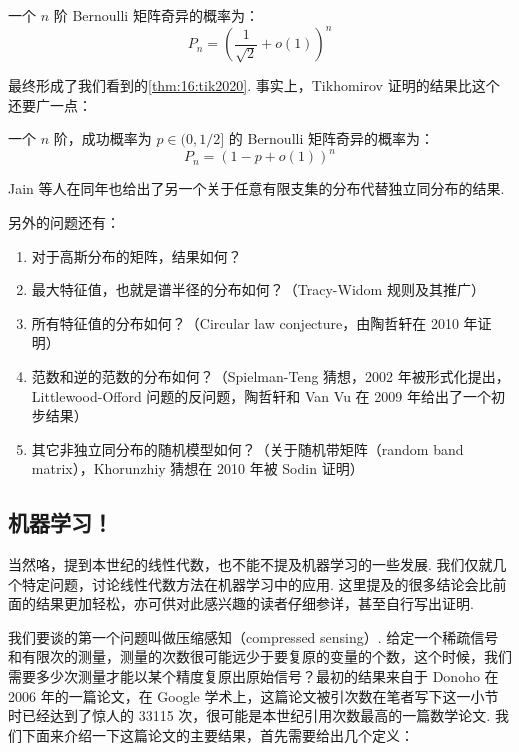 \begin{theorem}[Bourgain, 2010]
    一个 $n$ 阶 Bernoulli 矩阵奇异的概率为：
    \[
    P_n = \left( \frac{1}{\sqrt{2}} + o(1) \right)^n
    \]
\end{theorem}

最终形成了我们看到的\autoref{thm:16:tik2020}. 事实上，Tikhomirov 证明的结果比这个还要广一点：

\begin{theorem}[Tikhomirov, 2020]
    一个 $n$ 阶，成功概率为 $p \in (0, 1/2]$ 的 Bernoulli 矩阵奇异的概率为：
    \[
    P_n = \left( 1 - p + o(1) \right)^n
    \]
\end{theorem}

Jain 等人在同年也给出了另一个关于任意有限支集的分布代替独立同分布的结果.

另外的问题还有：

\begin{enumerate}
    \item 对于高斯分布的矩阵，结果如何？
    \item 最大特征值，也就是谱半径的分布如何？（Tracy-Widom 规则及其推广）
    \item 所有特征值的分布如何？（Circular law conjecture，由陶哲轩在 2010 年证明）
    \item 范数和逆的范数的分布如何？（Spielman-Teng 猜想，2002 年被形式化提出，Littlewood-Offord 问题的反问题，陶哲轩和 Van Vu 在 2009 年给出了一个初步结果）
    \item 其它非独立同分布的随机模型如何？（关于随机带矩阵（random band matrix），Khorunzhiy 猜想在 2010 年被 Sodin 证明）
\end{enumerate}

\subsection{机器学习！}

当然咯，提到本世纪的线性代数，也不能不提及机器学习的一些发展. 我们仅就几个特定问题，讨论线性代数方法在机器学习中的应用. 这里提及的很多结论会比前面的结果更加轻松，亦可供对此感兴趣的读者仔细参详，甚至自行写出证明.

我们要谈的第一个问题叫做压缩感知（compressed sensing）. 给定一个稀疏信号和有限次的测量，测量的次数很可能远少于要复原的变量的个数，这个时候，我们需要多少次测量才能以某个精度复原出原始信号？最初的结果来自于 Donoho 在 2006 年的一篇论文，在 Google 学术上，这篇论文被引次数在笔者写下这一小节时已经达到了惊人的 33115 次，很可能是本世纪引用次数最高的一篇数学论文. 我们下面来介绍一下这篇论文的主要结果，首先需要给出几个定义：

